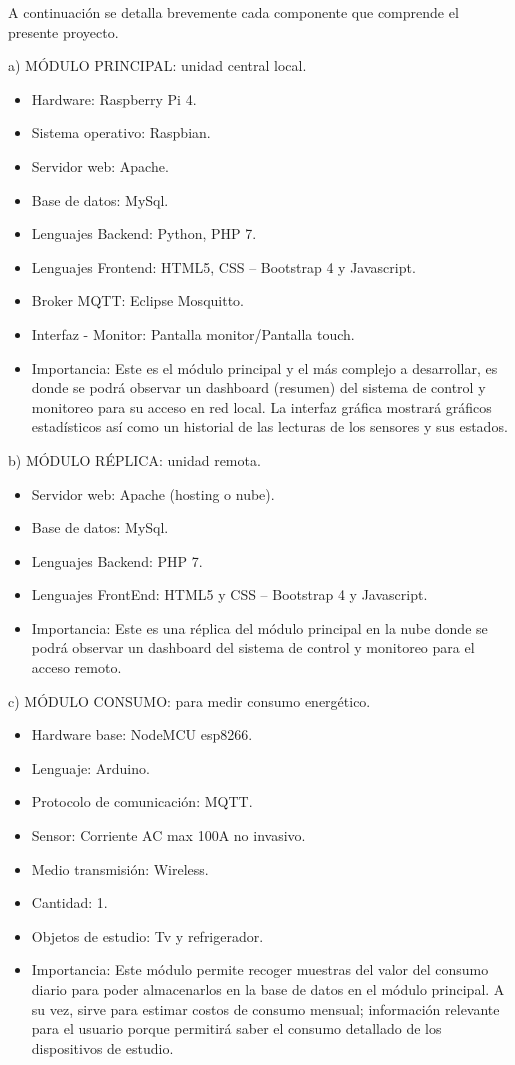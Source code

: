 \documentclass[11pt]{charter}
\begin{document}

A continuación se detalla brevemente cada componente que comprende el presente proyecto.

a) MÓDULO PRINCIPAL: unidad central local.
\begin{itemize}
\item Hardware: Raspberry Pi 4.
\item Sistema operativo: Raspbian.
\item Servidor web: Apache.
\item Base de datos: MySql.
\item Lenguajes Backend: Python, PHP 7.
\item Lenguajes Frontend: HTML5, CSS – Bootstrap 4 y Javascript.
\item Broker MQTT: Eclipse Mosquitto.
\item Interfaz - Monitor: Pantalla monitor/Pantalla touch.
\item Importancia: Este es el módulo principal y el más complejo a desarrollar, es donde se podrá observar un dashboard (resumen) del sistema de control y monitoreo para su acceso en red local. La interfaz gráfica mostrará gráficos estadísticos así como un historial de las lecturas de los sensores y sus estados.
\end{itemize}

b) MÓDULO RÉPLICA: unidad remota.
\begin{itemize}
\item Servidor web: Apache (hosting o nube).
\item Base de datos: MySql.
\item Lenguajes Backend: PHP 7.
\item Lenguajes FrontEnd: HTML5 y CSS – Bootstrap 4 y Javascript.
\item Importancia: Este es una réplica del módulo principal en la nube donde se podrá observar un dashboard del sistema de control y monitoreo para el acceso remoto.
\end{itemize}


c) MÓDULO CONSUMO: para medir consumo energético.
\begin{itemize}
\item Hardware base: NodeMCU esp8266.
\item Lenguaje: Arduino.
\item Protocolo de comunicación: MQTT.
\item Sensor: Corriente AC max 100A no invasivo.
\item Medio transmisión: Wireless.
\item Cantidad: 1.
\item Objetos de estudio: Tv y refrigerador.
\item Importancia: Este módulo permite recoger muestras del valor del consumo diario para poder almacenarlos en la base de datos en el módulo principal. A su vez, sirve para estimar costos de consumo mensual; información relevante para el usuario porque permitirá saber el consumo detallado de los dispositivos de estudio.
\end{itemize}
\end{document}
